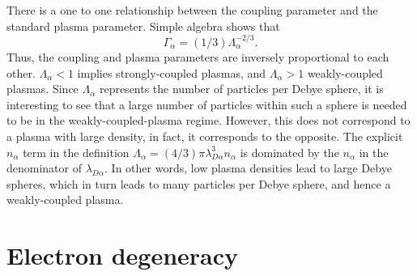 \documentclass[a4paper,11pt]{report}
\begin{document}
There is a one to one relationship between the coupling parameter and the standard plasma parameter. Simple algebra shows that 
\begin{equation}
    \Gamma_\alpha = (1/3) \Lambda_\alpha^{-2/3}.
\end{equation}
Thus, the coupling and plasma parameters are inversely proportional to each other. $\Lambda_\alpha < 1$ implies strongly-coupled plasmas, and $\Lambda_\alpha > 1$ weakly-coupled plasmas. Since $\Lambda_\alpha$ represents the number of particles per Debye sphere, it is interesting to see that a large number of particles within such a sphere is needed to be in the weakly-coupled-plasma regime. However, this does not correspond to a plasma with large density, in fact, it corresponds to the opposite. The explicit $n_\alpha$ term in the definition $\Lambda_\alpha = (4/3) \pi \lambda^3_{D\alpha} n_\alpha$ is dominated by the $n_\alpha$ in the denominator of $\lambda_{D\alpha}$. In other words, low plasma densities lead to large Debye spheres, which in turn leads to many particles per Debye sphere, and hence a weakly-coupled plasma.

\section{Electron degeneracy}
\end{document}
